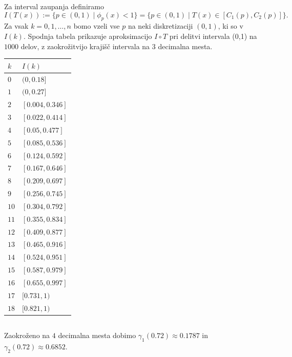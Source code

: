 \documentclass[ letterpaper, titlepage, fleqn]{article}
\begin{document}
Za interval zaupanja definiramo
$$I(T(x)) := \{p \in (0,1) \mid \phi_p(x) < 1\} = \{p \in (0,1) \mid T(x) \in [C_1(p), C_2(p)]\}.$$
Za vsak $k=0,1,\dots,n$ bomo vzeli vse $p$ na neki diskretizaciji $(0,1)$, ki so v $I(k)$. Spodnja tabela prikazuje aproksimacijo $I\circ T$ pri delitvi intervala (0,1) na $1000$ delov, z zaokrožitvijo krajišč intervala na $3$ decimalna mesta.
\begin{center}
\begin{tabular}{ l | l }
$k$ & $I(k)$ \\
\hline
$0$ & $ (0, 0.18]$ \\
$1$ & $(0, 0.27]$ \\
$2$ & $[0.004, 0.346]$ \\
$3$ & $[0.022, 0.414]$ \\
$4$ & $[0.05, 0.477]$ \\
$5$ & $[0.085, 0.536]$ \\
$6$ & $[0.124, 0.592]$ \\
$7$ & $[0.167, 0.646]$ \\
$8$ & $[0.209, 0.697]$ \\
$9$ & $[0.256, 0.745]$ \\
$10$ & $[0.304, 0.792]$ \\
$11$ & $[0.355, 0.834]$ \\
$12$ & $[0.409, 0.877]$ \\
$13$ & $[0.465, 0.916]$ \\
$14$ & $[0.524, 0.951]$ \\
$15$ & $[0.587, 0.979]$ \\
$16$ & $[0.655, 0.997]$ \\
$17$ & $[0.731, 1)$ \\
$18$ & $[0.821, 1)$
\end{tabular}
\end{center}

\subsection{}
Zaokroženo na $4$ decimalna mesta dobimo $\gamma_1(0.72) \approx 0.1787$ in $\gamma_2(0.72) \approx 0.6852$.
\end{document}
